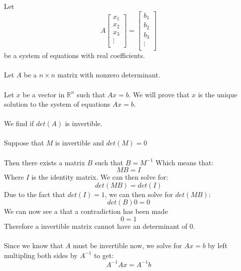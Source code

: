 \documentclass{article}
\begin{document}
Let 
\begin{equation}
    A \begin{bmatrix}
    x_1 \\
    x_2 \\
    x_3 \\
    \vdots \\
    \end{bmatrix}
    = \begin{bmatrix}
    b_1 \\
    b_2 \\
    b_3 \\
    \vdots \\
    \end{bmatrix}
\end{equation}
be a system of equations with real coefficients. 
\\\\
Let $A$ be a $n \times n$ matrix with nonzero determinant. 
\\\\
Let $x$ be a vector in $\mathbb{R}^n$ such that $Ax = b$. We will prove that $x$ is the unique solution to the system of equations $Ax = b$.
\\\\
We find if $det(A)$ is invertible.
\\\\
Suppose that $M$ is invertible and $det(M) = 0$
\\\\
Then there exists a matrix $B$ such that $B = M^{-1}$
Which means that:
\begin{equation}
    MB = I
\end{equation}
Where $I$ is the identity matrix. We can then solve for:
\begin{equation}
    det(MB) = det(I)
\end{equation}
Due to the fact that $det(I) = 1$, we can then solve for $det(MB)$:
\begin{equation}
    det(B)0 = 0
\end{equation}
We can now see a that a contradiction has been made
\begin{equation}
    0 = 1
\end{equation}
Therefore a invertible matrix cannot have an determinant of 0.
\\\\
Since we know that $A$ must be invertible now, we solve for $Ax = b$ by left multipling both sides by $A^{-1}$ to get:
\begin{equation}
    A^{-1}Ax = A^{-1}b
\end{equation}
\end{document}
